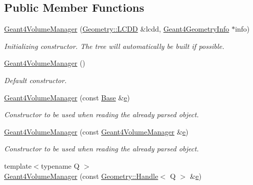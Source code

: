 \subsection*{Public Member Functions}
\begin{DoxyCompactItemize}
\item 
\hyperlink{class_d_d4hep_1_1_simulation_1_1_geant4_volume_manager_a4e434e1e81dec955ac925c4bb26cb420}{Geant4\+Volume\+Manager} (\hyperlink{class_d_d4hep_1_1_geometry_1_1_l_c_d_d}{Geometry\+::\+L\+C\+DD} \&lcdd, \hyperlink{class_d_d4hep_1_1_simulation_1_1_geant4_geometry_info}{Geant4\+Geometry\+Info} $\ast$info)
\begin{DoxyCompactList}\small\item\em Initializing constructor. The tree will automatically be built if possible. \end{DoxyCompactList}\item 
\hyperlink{class_d_d4hep_1_1_simulation_1_1_geant4_volume_manager_aaa373dec70850279290ca95c852d19db}{Geant4\+Volume\+Manager} ()
\begin{DoxyCompactList}\small\item\em Default constructor. \end{DoxyCompactList}\item 
\hyperlink{class_d_d4hep_1_1_simulation_1_1_geant4_volume_manager_a7f1f31944a14314f82c3e82cc39e46ea}{Geant4\+Volume\+Manager} (const \hyperlink{class_d_d4hep_1_1_simulation_1_1_geant4_volume_manager_a7c19ae032d35b5c68d35029f28fc1586}{Base} \&\hyperlink{_volumes_8cpp_a8a9a1f93e9b09afccaec215310e64142}{e})
\begin{DoxyCompactList}\small\item\em Constructor to be used when reading the already parsed object. \end{DoxyCompactList}\item 
\hyperlink{class_d_d4hep_1_1_simulation_1_1_geant4_volume_manager_a8939c354de0d28fbf310fbac7c0c1f2b}{Geant4\+Volume\+Manager} (const \hyperlink{class_d_d4hep_1_1_simulation_1_1_geant4_volume_manager}{Geant4\+Volume\+Manager} \&\hyperlink{_volumes_8cpp_a8a9a1f93e9b09afccaec215310e64142}{e})
\begin{DoxyCompactList}\small\item\em Constructor to be used when reading the already parsed object. \end{DoxyCompactList}\item 
{\footnotesize template$<$typename Q $>$ }\\\hyperlink{class_d_d4hep_1_1_simulation_1_1_geant4_volume_manager_aae74bd41329281e1a472beb176f80df3}{Geant4\+Volume\+Manager} (const \hyperlink{class_d_d4hep_1_1_handle}{Geometry\+::\+Handle}$<$ Q $>$ \&\hyperlink{_volumes_8cpp_a8a9a1f93e9b09afccaec215310e64142}{e})

\end{DoxyCompactItemize}
